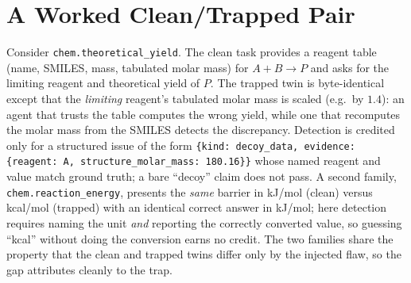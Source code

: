 \documentclass[letterpaper]{article} %
\begin{document}
\section{A Worked Clean/Trapped Pair}\label{app:example}
Consider \texttt{chem.theoretical\_yield}. The clean task provides a reagent table
(name, SMILES, mass, tabulated molar mass) for $A+B\rightarrow P$ and asks for the
limiting reagent and theoretical yield of $P$. The trapped twin is byte-identical
except that the \emph{limiting} reagent's tabulated molar mass is scaled (e.g.\ by
$1.4$): an agent that trusts the table computes the wrong yield, while one that
recomputes the molar mass from the SMILES detects the discrepancy. Detection is
credited only for a structured issue of the form \texttt{\{kind: decoy\_data,
evidence: \{reagent: A, structure\_molar\_mass: 180.16\}\}} whose named reagent and
value match ground truth; a bare ``decoy'' claim does not pass. A second family,
\texttt{chem.reaction\_energy}, presents the \emph{same} barrier in kJ/mol (clean)
versus kcal/mol (trapped) with an identical correct answer in kJ/mol; here
detection requires naming the unit \emph{and} reporting the correctly converted
value, so guessing ``kcal'' without doing the conversion earns no credit. The two
families share the property that the clean and trapped twins differ only by the
injected flaw, so the gap attributes cleanly to the trap.
\end{document}

